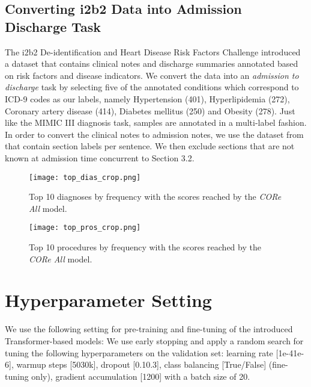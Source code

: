 \documentclass[11pt,a4paper]{article}
\begin{document}
\subsection{Converting i2b2 Data into Admission Discharge Task}
\label{app:i2b2-prep}
The i2b2 De-identification and Heart Disease Risk Factors Challenge \cite{i2b2-2014,i2b2-2014-2} introduced a dataset that contains clinical notes and discharge summaries annotated based on risk factors and disease indicators. We convert the data into an \textit{admission to discharge} task by selecting five of the annotated conditions which correspond to ICD-9 codes as our labels, namely Hypertension (401), Hyperlipidemia (272), Coronary artery disease (414), Diabetes mellitus (250) and Obesity (278). Just like the MIMIC III diagnosis task, samples are annotated in a multi-label fashion.
In order to convert the clinical notes to admission notes, we use the dataset from \citet{i2b2-section-prediction} that contain section labels per sentence. We then exclude sections that are not known at admission time concurrent to Section 3.2.

\begin{figure}[t!]
  \centering
  \texttt{[image: top\_dias\_crop.png]}
  \caption{Top 10 diagnoses by frequency with the scores reached by the \textit{CORe All} model.}
\label{fig:top_dia}
\end{figure}

\begin{figure}[t!]
  \centering
  \texttt{[image: top\_pros\_crop.png]}
  \caption{Top 10 procedures by frequency with the scores reached by the \textit{CORe All} model.}
\label{fig:top_pro}
\end{figure}

\section{Hyperparameter Setting}
\label{app:hyperparameter}
We use the following setting for pre-training and fine-tuning of the introduced Transformer-based models:
We use early stopping and apply a random search for tuning the following hyperparameters on the validation set: learning rate [1e-41e-6], warmup steps [5030k], dropout [0.10.3], class balancing [True/False] (fine-tuning only), gradient accumulation [1200] with a batch size of 20.
\end{document}
